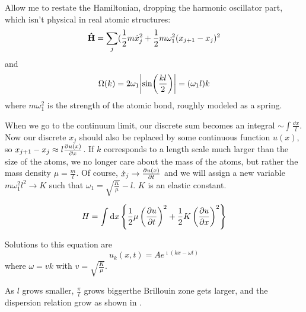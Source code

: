 \documentclass[a4paper,twoside,master.tex]{subfiles}
\begin{document}

Allow me to restate the Hamiltonian, dropping the harmonic oscillator part, which isn't physical in real atomic structures:
\begin{equation}
    \vu{H} = \sum_j (\frac{1}{2} m \dot{x}^2_j + \frac{1}{2} m \omega_1^2 (x_{j+1} - x_j)^2
\end{equation}
and
\begin{equation}
    \Omega(k) = 2 \omega_1 \abs{\sin(\frac{kl}{2})} = (\omega_1 l)k
\end{equation}
where $ m \omega_1^2 $ is the strength of the atomic bond, roughly modeled as a spring.

When we go to the continuum limit, our discrete sum becomes an integral $ \sim \int \frac{\dd{x}}{l} $. Now our discrete $ x_j $ should also be replaced by some continuous function $ u(x) $, so $ x_{j+1} - x_j \approx l \pdv{u(x)}{x} $. If $ k $ corresponds to a length scale much larger than the size of the atoms, we no longer care about the mass of the atoms, but rather the mass density $ \mu = \frac{m}{l} $. Of course, $ \dot{x}_j \to \pdv{u(x)}{t} $ and we will assign a new variable $ m \omega_1^2 l^2 \to K $ such that $ \omega_1 = \sqrt{\frac{K}{\mu}} - l $. $ K $ is an elastic constant.

\begin{equation}
    H = \int \dd{x} \left\{ \frac{1}{2} \mu \left( \pdv{u}{t} \right)^2 + \frac{1}{2} K \left( \pdv{u}{x} \right)^2 \right\}
\end{equation}

Solutions to this equation are
\begin{equation}
    u_{k}(x,t) = A e^{\imath (k x - \omega t)} 
\end{equation}
where $ \omega = vk $ with $ v = \sqrt{\frac{K}{\mu}} $.

As $ l $ grows smaller, $ \frac{\pi}{l} $ grows bigger\textemdash the Brillouin zone gets larger, and the dispersion relation grow as shown in .
\end{document}
